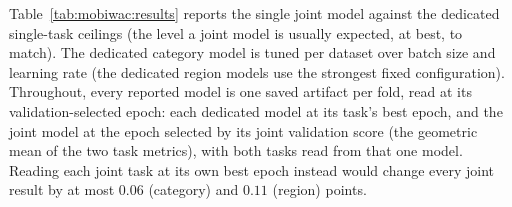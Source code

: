 Table~\ref{tab:mobiwac:results} reports the single joint model against the dedicated
single-task ceilings (the level a joint model is usually expected, at
best, to match). The dedicated category model is tuned per dataset over batch size and learning rate (the dedicated region models use the strongest fixed configuration).
Throughout, every reported model is one saved artifact per fold, read at its
validation-selected epoch: each dedicated model at its task's best epoch, and
the joint model at the epoch selected by its joint validation score (the
geometric mean of the two task metrics), with both tasks read from that one
model. Reading each joint task at its own best epoch instead would change every
joint result by at most $0.06$ (category) and $0.11$ (region) points.

